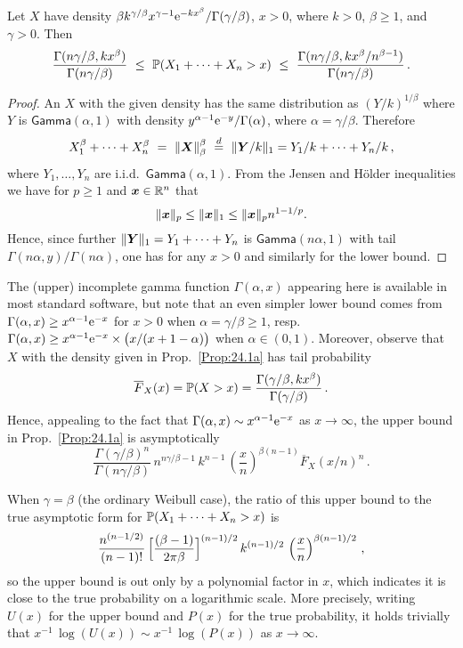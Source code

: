 \begin{proposition}\label{Prop:24.1a} Let $X$ have density $\beta k^{\gamma/\beta} x^{\gamma-1}\mathrm{e}^{-kx^\beta}
/\Gamma(\gamma/\beta)$, $x>0$, where $k>0$, $\beta\geq 1$, and $\gamma>0$. Then
\[ \frac{\Gamma(n\gamma/\beta,kx^\beta)}{\Gamma(n\gamma/\beta)}
\ \le\ \mathbb{P}(X_1 + \cdots + X_n > x)\ \le \
\frac{\Gamma(n\gamma/\beta,kx^\beta/n^{\beta-1})}{\Gamma(n\gamma/\beta)}\,.\]
\end{proposition}
\begin{proof}
An $X$ with the given density has the same distribution as $(Y/k)^{1/\beta}$
where $Y$ is $\mathsf{Gamma}(\alpha,1)$ with density
$y^{\alpha-1}\mathrm{e}^{-y}/\Gamma(\alpha)$, where $\alpha=\gamma/\beta$.
Therefore
\[ X_1^\beta + \cdots + X_n^\beta\ =\ \|\bfX\|_\beta^\beta \ \stackrel{d}{=} \ \|\bfY/k\|_1=
Y_1/k+ \cdots + Y_n/k\,,\]
where $Y_1,\ldots,Y_n$ are i.i.d.\ $\mathsf{Gamma}(\alpha,1)$.
From the Jensen and H\"older inequalities we have for $p\ge 1$ and $\bm{x} \in \mathbb{R}^n$ that
$$ \|\bm{x}\|_p \le  \|\bm{x}\|_1 \le  \|\bm{x}\|_p  n^{1- 1/p}. $$
Hence, since further $ \|\bm{Y}\|_1=Y_1+\cdots+Y_n$ is $\mathsf{Gamma}(n\alpha,1)$ with tail $\Gamma(n\alpha,y)/
\Gamma(n\alpha)$, one has for any $x>0$
and similarly for the lower bound.
\end{proof}
The (upper) incomplete gamma function $\Gamma(\alpha,x)$ appearing here is available in most
standard software, but note that an even simpler lower bound comes from
$\Gamma(\alpha,x)\ge x^{\alpha-1}\mathrm{e}^{-x}$ for $x>0$ when $\alpha = \gamma/\beta \geq 1$, resp.\
$\Gamma(\alpha,x)\ge x^{\alpha-1}\mathrm{e}^{-x} \times \big( x/(x+1-\alpha) \big)$
when $\alpha \in (0,1)$.
Moreover, observe that $X$ with the density given in Prop.~\ref{Prop:24.1a} has tail probability
\[
\overline{F}_X(x) = \mathbb{P}(X>x) = \frac{\Gamma(\gamma/\beta,k x^\beta)}{\Gamma(\gamma/\beta)}\,.
\]
Hence, appealing to the fact that $\Gamma(\alpha,x) \sim x^{\alpha-1} \mathrm{e}^{-x}$ as $x\to\infty$,
the upper bound in Prop.~\ref{Prop:24.1a} is asymptotically
\[
\frac{\Gamma(\gamma/\beta)^n}{\Gamma(n\gamma/\beta)}\,n^{n\gamma/\beta -1} \, k^{n-1}\,\left(\frac{x}{n}\right)^{\beta(n-1)} \overline{F}_X(x/n)^n\,.
\]

When $\gamma=\beta$ (the ordinary Weibull case), the ratio of this upper bound to the
true asymptotic form for $\mathbb{P}(X_1 + \cdots + X_n > x)$ is
\[
\frac{n^{(n-1/2)}}{(n-1)!}\,\Bigl[ \frac{(\beta-1)}{2\pi\beta}\Bigr]^{(n-1)/2} \,k^{(n-1)/2}\,\left(\frac{x}{n}\right)^{\beta(n-1)/2} \,,
\]
so the upper bound is out only by a polynomial factor in $x$, which indicates
it is close to the true probability on a logarithmic scale.
More precisely, writing $U(x)$ for the upper bound and $P(x)$ for the true probability,
it holds trivially that $x^{-1} \, \log(U(x)) \sim x^{-1} \, \log(P(x))$ as $x\to\infty$.

